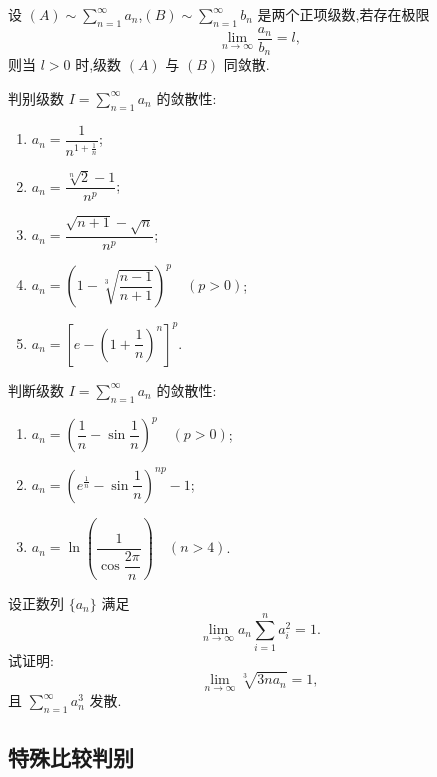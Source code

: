 \documentclass[../数学分析培优讲义.tex]{subfiles}
\begin{document}
\newpage


\begin{theorem}
设 $\displaystyle(A)\sim\sum\limits_{n=1}^{\infty}a_n$,$\displaystyle(B)\sim\sum\limits_{n=1}^{\infty}b_n$ 是两个正项级数,若存在极限
\[
    \lim\limits_{n\to\infty}\dfrac{a_n}{b_n}=l,
\]
则当 $l>0$ 时,级数 $(A)$ 与 $(B)$ 同敛散.
\end{theorem}

\begin{example}
判别级数 $\displaystyle I=\sum\limits_{n=1}^{\infty}a_n$ 的敛散性:
\begin{enumerate}[label=(\arabic*)]
    \item $\displaystyle a_n=\dfrac{1}{n^{1+\frac{1}{n}}}$;
    \item $\displaystyle a_n=\dfrac{\sqrt[n]{2}-1}{n^p}$;
    \item $\displaystyle a_n=\dfrac{\sqrt{n+1}-\sqrt n}{n^p}$;
    \item $\displaystyle a_n=\left(1-\sqrt[3]{\dfrac{n-1}{n+1}}\right)^p\quad(p>0)$;
    \item $\displaystyle a_n=\left[e-\left(1+\dfrac{1}{n}\right)^n\right]^p$.
\end{enumerate}
\end{example}
\exampleblank

\begin{example}
判断级数 $\displaystyle I=\sum\limits_{n=1}^{\infty}a_n$ 的敛散性:
\begin{enumerate}[label=(\arabic*)]
    \item $\displaystyle a_n=\left(\dfrac{1}{n}-\sin\dfrac{1}{n}\right)^p\quad(p>0)$;
    \item $\displaystyle a_n=\left(e^{\frac{1}{n}}-\sin\dfrac{1}{n}\right)^{np}-1$;
    \item $\displaystyle a_n=\ln\left(\dfrac{1}{\cos\dfrac{2\pi}{n}}\right)\quad(n>4)$.
\end{enumerate}
\end{example}
\exampleblank

\begin{example}
设正数列 $\{a_n\}$ 满足
\[
    \lim\limits_{n\to\infty}a_n\sum\limits_{i=1}^na_i^2=1.
\]
试证明:
\[
    \lim\limits_{n\to\infty}\sqrt[3]{3na_n}=1,
\]
且 $\displaystyle\sum\limits_{n=1}^{\infty}a_n^3$ 发散.
\end{example}
\exampleblank


\newpage

\subsection{特殊比较判别}
\end{document}
